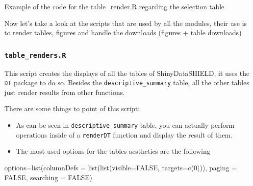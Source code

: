 \documentclass[
]{book}
\newenvironment{Shaded}{\begin{snugshade}}{\end{snugshade}}
\newcommand{\AttributeTok}[1]{\textcolor[rgb]{0.77,0.63,0.00}{#1}}
\newcommand{\ConstantTok}[1]{\textcolor[rgb]{0.00,0.00,0.00}{#1}}
\newcommand{\DecValTok}[1]{\textcolor[rgb]{0.00,0.00,0.81}{#1}}
\newcommand{\FunctionTok}[1]{\textcolor[rgb]{0.00,0.00,0.00}{#1}}
\newcommand{\NormalTok}[1]{#1}
\newcommand{\OtherTok}[1]{\textcolor[rgb]{0.56,0.35,0.01}{#1}}
\newcommand{\SpecialCharTok}[1]{\textcolor[rgb]{0.00,0.00,0.00}{#1}}
\newcommand{\StringTok}[1]{\textcolor[rgb]{0.31,0.60,0.02}{#1}}
\providecommand{\tightlist}{%
  \setlength{\itemsep}{0pt}\setlength{\parskip}{0pt}}
\begin{document}
Example of the code for the table\_render.R regarding the selection table

\begin{Shaded}
\end{Shaded}

Now let's take a look at the scripts that are used by all the modules, their use is to render tables, figures and handle the downloads (figures + table downloads)

\hypertarget{table_renders.r}{%
\subsubsection{\texorpdfstring{\texttt{table\_renders.R}}{table\_renders.R}}\label{table_renders.r}}

This script creates the displays of all the tables of ShinyDataSHIELD, it uses the \texttt{DT} package to do so. Besides the \texttt{descriptive\_summary} table, all the other tables just render results from other functions.

There are some things to point of this script:

\begin{itemize}
\tightlist
\item
  As can be seen in \texttt{descriptive\_summary} table, you can actually perform operations inside of a \texttt{renderDT} function and display the result of them.
\item
  The most used options for the tables aesthetics are the following
\end{itemize}

\begin{Shaded}
\begin{Highlighting}[]
\NormalTok{options}\OtherTok{=}\FunctionTok{list}\NormalTok{(}\AttributeTok{columnDefs =} \FunctionTok{list}\NormalTok{(}\FunctionTok{list}\NormalTok{(}\AttributeTok{visible=}\ConstantTok{FALSE}\NormalTok{, }\AttributeTok{targets=}\FunctionTok{c}\NormalTok{(}\DecValTok{0}\NormalTok{))),}
                                          \AttributeTok{paging =} \ConstantTok{FALSE}\NormalTok{, }\AttributeTok{searching =} \ConstantTok{FALSE}\NormalTok{)}
\end{Highlighting}
\end{Shaded}
\end{document}
